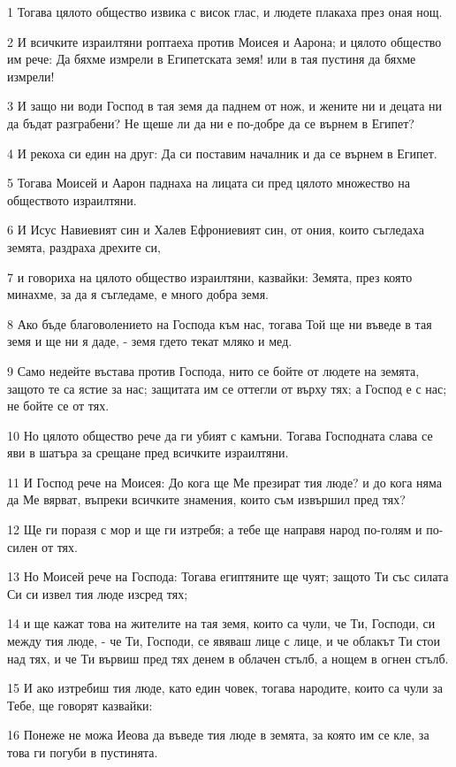 \par 1 Тогава цялото общество извика с висок глас, и людете плакаха през оная нощ.
\par 2 И всичките израилтяни роптаеха против Моисея и Аарона; и цялото общество им рече: Да бяхме измрели в Египетската земя! или в тая пустиня да бяхме измрели!
\par 3 И защо ни води Господ в тая земя да паднем от нож, и жените ни и децата ни да бъдат разграбени? Не щеше ли да ни е по-добре да се върнем в Египет?
\par 4 И рекоха си един на друг: Да си поставим началник и да се върнем в Египет.
\par 5 Тогава Моисей и Аарон паднаха на лицата си пред цялото множество на обществото израилтяни.
\par 6 И Исус Навиевият син и Халев Ефрониевият син, от ония, които съгледаха земята, раздраха дрехите си,
\par 7 и говориха на цялото общество израилтяни, казвайки: Земята, през която минахме, за да я съгледаме, е много добра земя.
\par 8 Ако бъде благоволението на Господа към нас, тогава Той ще ни въведе в тая земя и ще ни я даде, - земя гдето текат мляко и мед.
\par 9 Само недейте въстава против Господа, нито се бойте от людете на земята, защото те са ястие за нас; защитата им се оттегли от върху тях; а Господ е с нас; не бойте се от тях.
\par 10 Но цялото общество рече да ги убият с камъни. Тогава Господната слава се яви в шатъра за срещане пред всичките израилтяни.
\par 11 И Господ рече на Моисея: До кога ще Ме презират тия люде? и до кога няма да Ме вярват, въпреки всичките знамения, които съм извършил пред тях?
\par 12 Ще ги поразя с мор и ще ги изтребя; а тебе ще направя народ по-голям и по-силен от тях.
\par 13 Но Моисей рече на Господа: Тогава египтяните ще чуят; защото Ти със силата Си си извел тия люде изсред тях;
\par 14 и ще кажат това на жителите на тая земя, които са чули, че Ти, Господи, си между тия люде, - че Ти, Господи, се явяваш лице с лице, и че облакът Ти стои над тях, и че Ти вървиш пред тях денем в облачен стълб, а нощем в огнен стълб.
\par 15 И ако изтребиш тия люде, като един човек, тогава народите, които са чули за Тебе, ще говорят казвайки:
\par 16 Понеже не можа Иеова да въведе тия люде в земята, за която им се кле, за това ги погуби в пустинята.
